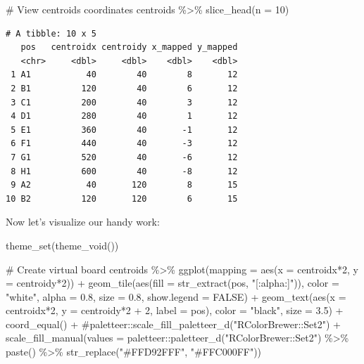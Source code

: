 \documentclass[
  letterpaper,
  DIV=11,
  numbers=noendperiod]{scrreprt}
\newenvironment{Shaded}{\begin{snugshade}}{\end{snugshade}}
\newcommand{\AttributeTok}[1]{\textcolor[rgb]{0.40,0.45,0.13}{#1}}
\newcommand{\CommentTok}[1]{\textcolor[rgb]{0.37,0.37,0.37}{#1}}
\newcommand{\ConstantTok}[1]{\textcolor[rgb]{0.56,0.35,0.01}{#1}}
\newcommand{\DecValTok}[1]{\textcolor[rgb]{0.68,0.00,0.00}{#1}}
\newcommand{\FloatTok}[1]{\textcolor[rgb]{0.68,0.00,0.00}{#1}}
\newcommand{\FunctionTok}[1]{\textcolor[rgb]{0.28,0.35,0.67}{#1}}
\newcommand{\NormalTok}[1]{\textcolor[rgb]{0.00,0.23,0.31}{#1}}
\newcommand{\SpecialCharTok}[1]{\textcolor[rgb]{0.37,0.37,0.37}{#1}}
\newcommand{\StringTok}[1]{\textcolor[rgb]{0.13,0.47,0.30}{#1}}
\begin{document}
\begin{Shaded}
\begin{Highlighting}[]
\CommentTok{\# View centroids coordinates}
\NormalTok{centroids }\SpecialCharTok{\%\textgreater{}\%} 
  \FunctionTok{slice\_head}\NormalTok{(}\AttributeTok{n =} \DecValTok{10}\NormalTok{)}
\end{Highlighting}
\end{Shaded}

\begin{verbatim}
# A tibble: 10 x 5
   pos   centroidx centroidy x_mapped y_mapped
   <chr>     <dbl>     <dbl>    <dbl>    <dbl>
 1 A1           40        40        8       12
 2 B1          120        40        6       12
 3 C1          200        40        3       12
 4 D1          280        40        1       12
 5 E1          360        40       -1       12
 6 F1          440        40       -3       12
 7 G1          520        40       -6       12
 8 H1          600        40       -8       12
 9 A2           40       120        8       15
10 B2          120       120        6       15
\end{verbatim}

Now let's visualize our handy work:

\begin{Shaded}
\begin{Highlighting}[]
\FunctionTok{theme\_set}\NormalTok{(}\FunctionTok{theme\_void}\NormalTok{())}

\CommentTok{\# Create virtual board}
\NormalTok{centroids }\SpecialCharTok{\%\textgreater{}\%} 
  \FunctionTok{ggplot}\NormalTok{(}\AttributeTok{mapping =} \FunctionTok{aes}\NormalTok{(}\AttributeTok{x =}\NormalTok{ centroidx}\SpecialCharTok{*}\DecValTok{2}\NormalTok{, }\AttributeTok{y =}\NormalTok{ centroidy}\SpecialCharTok{*}\DecValTok{2}\NormalTok{)) }\SpecialCharTok{+}
  \FunctionTok{geom\_tile}\NormalTok{(}\FunctionTok{aes}\NormalTok{(}\AttributeTok{fill =} \FunctionTok{str\_extract}\NormalTok{(pos, }\StringTok{"[:alpha:]"}\NormalTok{)), }\AttributeTok{color =} \StringTok{"white"}\NormalTok{, }\AttributeTok{alpha =} \FloatTok{0.8}\NormalTok{, }\AttributeTok{size =} \FloatTok{0.8}\NormalTok{, }\AttributeTok{show.legend =} \ConstantTok{FALSE}\NormalTok{) }\SpecialCharTok{+}
  \FunctionTok{geom\_text}\NormalTok{(}\FunctionTok{aes}\NormalTok{(}\AttributeTok{x =}\NormalTok{ centroidx}\SpecialCharTok{*}\DecValTok{2}\NormalTok{, }\AttributeTok{y =}\NormalTok{ centroidy}\SpecialCharTok{*}\DecValTok{2} \SpecialCharTok{+} \DecValTok{2}\NormalTok{, }\AttributeTok{label =}\NormalTok{ pos), }\AttributeTok{color =} \StringTok{"black"}\NormalTok{, }\AttributeTok{size =} \FloatTok{3.5}\NormalTok{) }\SpecialCharTok{+}
  \FunctionTok{coord\_equal}\NormalTok{() }\SpecialCharTok{+}
  \CommentTok{\#paletteer::scale\_fill\_paletteer\_d("RColorBrewer::Set2") +}
  \FunctionTok{scale\_fill\_manual}\NormalTok{(}\AttributeTok{values =}\NormalTok{ paletteer}\SpecialCharTok{::}\FunctionTok{paletteer\_d}\NormalTok{(}\StringTok{"RColorBrewer::Set2"}\NormalTok{) }\SpecialCharTok{\%\textgreater{}\%} \FunctionTok{paste}\NormalTok{() }\SpecialCharTok{\%\textgreater{}\%} \FunctionTok{str\_replace}\NormalTok{(}\StringTok{"\#FFD92FFF"}\NormalTok{, }\StringTok{"\#FFC000FF"}\NormalTok{))}
\end{Highlighting}
\end{Shaded}
\end{document}

